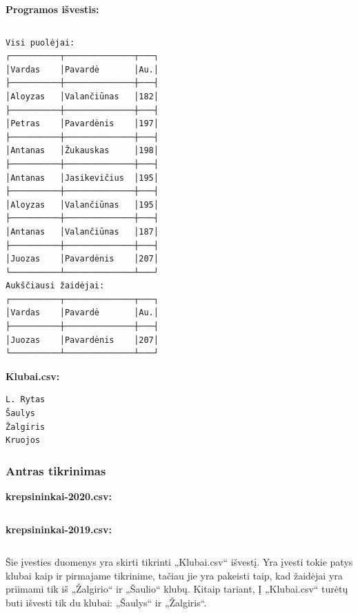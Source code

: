 \documentclass{article}
\begin{document}
\begin{changemargin}{0cm}{0cm}
    \textbf{Programos išvestis:}
\end{changemargin}


\inputminted[fontsize=\footnotesize]{csharp}{Assets/L2/test1-output.txt}

\footnotesize
\begin{verbatim}
Visi puolėjai:
┌──────────┬──────────────┬───┐
│Vardas    │Pavardė       │Au.│
├──────────┼──────────────┼───┤
│Aloyzas   │Valančiūnas   │182│
├──────────┼──────────────┼───┤
│Petras    │Pavardėnis    │197│
├──────────┼──────────────┼───┤
│Antanas   │Žukauskas     │198│
├──────────┼──────────────┼───┤
│Antanas   │Jasikevičius  │195│
├──────────┼──────────────┼───┤
│Aloyzas   │Valančiūnas   │195│
├──────────┼──────────────┼───┤
│Antanas   │Valančiūnas   │187│
├──────────┼──────────────┼───┤
│Juozas    │Pavardėnis    │207│
└──────────┴──────────────┴───┘
Aukščiausi žaidėjai:
┌──────────┬──────────────┬───┐
│Vardas    │Pavardė       │Au.│
├──────────┼──────────────┼───┤
│Juozas    │Pavardėnis    │207│
└──────────┴──────────────┴───┘
\end{verbatim}
\normalsize

\begin{changemargin}{0cm}{0cm}
    \textbf{Klubai.csv:}
\end{changemargin}

\footnotesize
\begin{verbatim}
L. Rytas
Šaulys
Žalgiris
Kruojos
\end{verbatim}
\normalsize

\subsubsection{Antras tikrinimas}
\begin{changemargin}{0cm}{0cm}
    \textbf{krepsininkai-2020.csv:}
\end{changemargin}

\inputminted{csharp}{Assets/L2/test2-input1.txt}

\begin{changemargin}{0cm}{0cm}
    \textbf{krepsininkai-2019.csv:}
\end{changemargin}

\inputminted{csharp}{Assets/L2/test2-input2.txt}


\begin{changemargin}{0cm}{0cm}
    Šie įvesties duomenys yra skirti tikrinti „Klubai.csv“ išvestį.
    Yra įvesti tokie patys klubai kaip ir pirmajame tikrinime, tačiau jie yra pakeisti taip,
    kad žaidėjai yra priimami tik iš „Žalgirio“ ir „Šaulio“ klubų.
    Kitaip tariant, Į „Klubai.csv“ turėtų buti išvesti tik du klubai: „Šaulys“ ir „Žalgiris“.
\end{changemargin}
\end{document}
